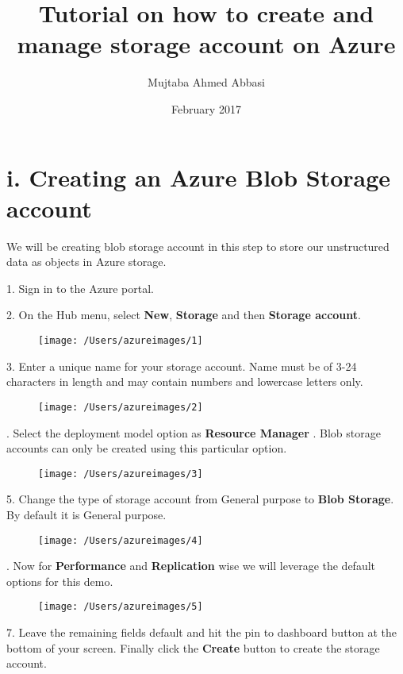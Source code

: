 \documentclass[12pt, letterpaper, twoside]{article}
\title{\textbf{Tutorial on how to create and manage storage account on Azure}}
\author{Mujtaba Ahmed Abbasi}
\date{February 2017}
\begin{document}
	
	\begin{titlepage}
		\clearpage\maketitle
		\thispagestyle{empty}
	\end{titlepage}
	
\setcounter{page}{1}
	
\section*{i. Creating an Azure Blob Storage account}	
We will be creating blob storage account in this step to store our unstructured data as objects in Azure storage. \par
\vspace{0.5cm}
1. Sign in to the Azure portal. \par
\vspace{0.5cm}
2. On the Hub menu, select \textbf{New}, \textbf{Storage} and then \textbf{Storage account}.
\begin{figure}[H]
	\centering
	\texttt{[image: /Users/azureimages/1]}
\end{figure}
3. Enter a unique name for your storage account. Name must be of 3-24 \indent characters in length and may contain numbers and lowercase letters only. 
\begin{figure}[H]
	\centering
	\texttt{[image: /Users/azureimages/2]}
\end{figure}
. Select the deployment model option as \textbf{Resource Manager} . Blob \indent storage accounts can only be created using this particular option. 
\begin{figure}[H]
	\centering
	\texttt{[image: /Users/azureimages/3]}
\end{figure}
5. Change the type of storage account from General purpose to \textbf{Blob \indent Storage}. By default it is General purpose.
\begin{figure}[H]
	\centering
	\texttt{[image: /Users/azureimages/4]}
\end{figure}
. Now for \textbf{Performance} and \textbf{Replication} wise we will leverage the \indent default options for this demo.
\begin{figure}[H]
	\centering
	\texttt{[image: /Users/azureimages/5]}
\end{figure}
7. Leave the remaining fields default and hit the pin to dashboard button \indent at the bottom of your screen. Finally click the \textbf{Create} button to create \indent the storage account.  


	
\end{document}
